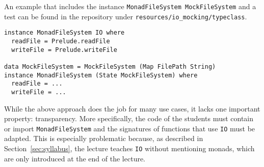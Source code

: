 An example that includes the instance \texttt{MonadFileSystem MockFileSystem} and a test can be found in the repository under \verb!resources/io_mocking/typeclass!.
\begin{verbatim}
instance MonadFileSystem IO where
  readFile = Prelude.readFile
  writeFile = Prelude.writeFile

data MockFileSystem = MockFileSystem (Map FilePath String)
instance MonadFileSystem (State MockFileSystem) where
  readFile = ...
  writeFile = ...
\end{verbatim}
While the above approach does the job for many use cases, it lacks one important property: transparency.
More specifically, the code of the students must contain or import \texttt{MonadFileSystem} and the signatures of functions that use \texttt{IO} must be adapted.
This is especially problematic because, as described in Section~\ref{sec:syllabus}, the lecture teaches \texttt{IO} without mentioning monads, which are only introduced at the end of the lecture.

